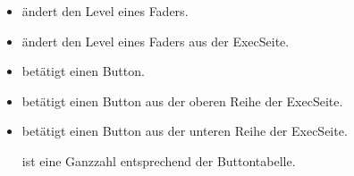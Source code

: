 \documentclass[letterpaper,10pt,ngerman]{sphinxmanual}
\begin{document}
\begin{itemize}
\item {} 
 ändert den Level eines Faders.

\item {} 
 ändert den Level eines Faders aus der
Exec\sphinxhyphen{}Seite.


\end{itemize}

\begin{itemize}
\item {} 
 betätigt einen Button.

\item {} 
 betätigt einen Button aus der oberen Reihe
der Exec\sphinxhyphen{}Seite.

\item {} 
 betätigt einen Button aus der unteren Reihe
der Exec\sphinxhyphen{}Seite.

 ist eine Ganzzahl entsprechend der Buttontabelle.

\end{itemize}
\end{document}
